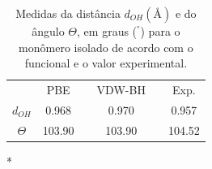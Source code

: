  \begin{table}[t!]
	\centering
	\caption{Medidas da distância $ d_{OH} ( \si{\angstrom})$ e do ângulo $ \Theta $, em graus ($^{{\si{\degree}}}$) para o monômero isolado de acordo com o funcional e o valor experimental.\label{tab:isolado}} 
	\begin{threeparttable}
		\begin{tabular}{cccccc} 
			\hline\hline\addlinespace[3.6pt]
			\multicolumn{6}{c}{\textbf{Monômero Isolado}}                                                                                                                                                                                      \\ 
			\midrule
			& PBE    &  & VDW-BH    &  & Exp.\tnote{*}  \\ 
			\midrule
			$ d_{OH} $ & 0.968  &  & 0.970  &  & 0.957                                                                                                                                                                    \\
			$\Theta$    & 103.90 &  & 103.90 &  & 104.52                                                                                                                                                                   \\
			\hline\hline
		\end{tabular}
		\begin{tablenotes}\footnotesize
			\item[*] \citeauthor{agua_exp}
		\end{tablenotes}
	\end{threeparttable}
\end{table}
